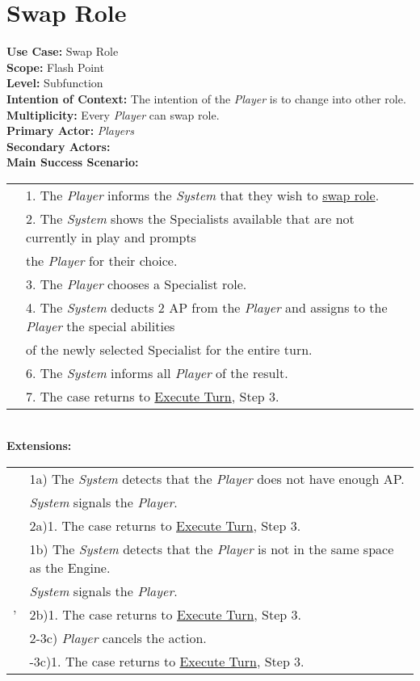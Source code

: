 \documentclass{article}
\begin{document}
	\section*{Swap Role}
	\textbf{Use Case:} Swap Role\\
	\textbf{Scope:} Flash Point\\
	\textbf{Level:} Subfunction\\
	\textbf{Intention of Context:} The intention of the \textit{Player} is to change into other role.\\
	\textbf{Multiplicity: }Every \textit{Player} can swap role.\\
	\textbf{Primary Actor:} \textit{Players}\\
	\textbf{Secondary Actors:}\\
	\textbf{Main Success Scenario:}\\
	\begin{tabular}{l l}
		&1. The \textit{Player} informs the \textit{System} that they wish to \underline{swap role}.\\
		&2. The \textit{System} shows the Specialists available that are not currently in play and prompts\\ &\qquad the \textit{Player} for their choice.\\
		&3. The \textit{Player} chooses a Specialist role.\\
		&4. The \textit{System} deducts 2 AP from the \textit{Player} and assigns to the \textit{Player} the special abilities\\
		&\qquad of the newly selected Specialist for the entire turn.\\
		&6. The \textit{System} informs all \textit{Player} of the result.\\
		&7. The case returns to \underline{Execute Turn}, Step 3.
	\end{tabular}\\
	\textbf{Extensions:}\\
	\begin{tabular}{l l}
		&1a) The \textit{System} detects that the \textit{Player} does not have enough AP.\\ &\qquad\textit{System} signals the \textit{Player}.\\
		&\qquad2a)1. The case returns to \underline{Execute Turn}, Step 3.\\
		&1b) The \textit{System} detects that the \textit{Player} is not in the same space as the Engine.\\
		&\qquad\textit{System} signals the \textit{Player}.\\'
		&\qquad2b)1. The case returns to \underline{Execute Turn}, Step 3.\\
		&2-3c) \textit{Player} cancels the action.\\
		&\qquad2-3c)1. The case returns to \underline{Execute Turn}, Step 3.
	\end{tabular}\\
	
\end{document}
